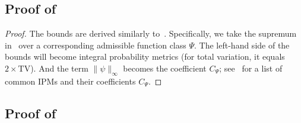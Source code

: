 \documentclass{article} %
\newcommand{\TV}{\mathrm{TV}}
\begin{document}
\subsection{Proof of \texorpdfstring{}{Theorem \ref*{thm:spec}}}\label{subsec:proofspec}
\thmspec*
\begin{proof}
    The bounds are derived similarly to~. Specifically, we take the supremum in~ over a corresponding admissible function class $\Psi$. The left-hand side of the bounds will become integral probability metrics (for total variation, it equals $2\times \TV$). And the term $\| \psi \|_\infty$ becomes the coefficient $C_\Psi$; see~ for a list of common IPMs and their coefficients $C_\Psi$.
\end{proof}

\subsection{Proof of \texorpdfstring{}{Theorem \ref*{cor:ES}}}\label{subsec:proofES}
\corES*
\end{document}
